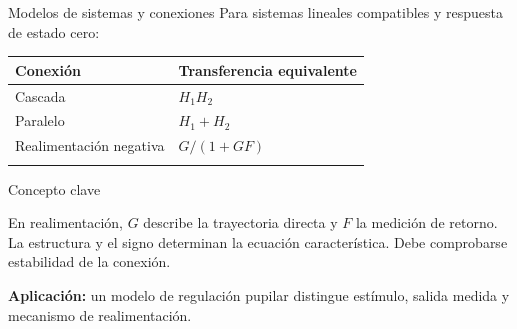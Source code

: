 \documentclass[
  10pt,
  ignorenonframetext,
  aspectratio=169,
  spanish,
]{beamer}
\begin{document}
\begin{frame}{Modelos de sistemas y conexiones}
\label{d3-043}
Para sistemas lineales compatibles y respuesta de estado cero:

\begin{longtable}[]{@{}ll@{}}
\toprule\noalign{}
Conexión & Transferencia equivalente \\
\midrule\noalign{}
\endhead
Cascada & \(H_1H_2\) \\
Paralelo & \(H_1+H_2\) \\
Realimentación negativa & \(G/(1+GF)\) \\
\bottomrule\noalign{}
\end{longtable}

\begin{block}{Concepto clave}

En realimentación, \(G\) describe la trayectoria directa y \(F\) la
medición de retorno. La estructura y el signo determinan la ecuación
característica. Debe comprobarse estabilidad de la conexión.

\end{block}

\textbf{Aplicación:} un modelo de regulación pupilar distingue estímulo,
salida medida y mecanismo de realimentación.

\end{frame}
\end{document}
